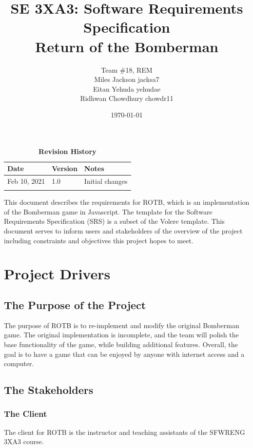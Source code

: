 \documentclass[12pt, titlepage]{article}
\title{SE 3XA3: Software Requirements Specification \\ Return of the Bomberman}
\author{Team \#18, REM
		\\ Miles Jackson  jacksa7
		\\ Eitan Yehuda  yehudae
		\\ Ridhwan Chowdhury chowdr11
}
\date{\today}
\begin{document}
\maketitle

\tableofcontents
\listoftables
\listoffigures

\begin{table}[bp]
\caption{\bf Revision History}
\begin{tabularx}{\textwidth}{p{3cm}p{2cm}X}
\toprule {\bf Date} & {\bf Version} & {\bf Notes}\\
\midrule
Feb 10, 2021 & 1.0 & Initial changes\\
 &  & \\
\bottomrule
\end{tabularx}
\end{table}

\newpage


This document describes the requirements for ROTB, which is an implementation of the Bomberman game in Javascript. The template for the Software Requirements Specification (SRS) is a subset of the Volere template. This document serves to inform users and stakeholders of the overview of the project including constraints and objectives this project hopes to meet.

\section{Project Drivers}

\subsection{The Purpose of the Project}
The purpose of ROTB is to re-implement and modify the original Bomberman game. The original implementation is incomplete, and the team will polish the base functionality of the game, while building additional features. Overall, the goal is to have a game that can be enjoyed by anyone with internet access and a computer.

\subsection{The Stakeholders}

\subsubsection{The Client}
The client for ROTB is the instructor and teaching assistants of the SFWRENG 3XA3 course.
\end{document}
